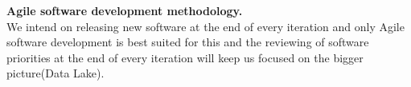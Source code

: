 
\textbf{ \large Agile software development methodology.}
\newline \\  We intend on releasing new software at the end of every iteration and only Agile software development is best suited for this and the reviewing of software priorities at the end of every iteration will keep us focused on the bigger picture(Data Lake). 
